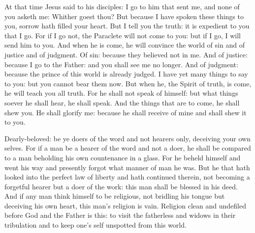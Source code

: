 \begin{multicols}{2}
At that time Jesus said to his disciples:
I go to him that sent me, and none of you asketh me: Whither goest thou?
But because I have spoken these things to you, sorrow hath filled your heart.
But I tell you the truth: it is expedient to you that I go.  For if I go not,
the Paraclete will not come to you: but if I go, I will send him to you.  And
when he is come, he will convince the world of sin and of justice and of
judgment.   Of sin: because they believed not in me.  And
of justice: because I go to the Father: and you shall see me no longer.  And of
judgment: because the prince of this world is already judged.  I have yet many
things to say to you: but you cannot bear them now.  But when he, the Spirit of
truth, is come, he will teach you all truth. For he shall not speak of himself:
but what things soever he shall hear, he shall speak. And the things that are
to come, he shall shew you.   He shall glorify me: because he shall receive
of mine and shall shew it to you.


\bigskip



Dearly-beloved: be ye doers of the word and not hearers only, deceiving your own selves.
For if a man be a hearer of the word and not a doer, he shall be compared to a
man beholding his own countenance in a glass.  For he beheld himself and went
his way and presently forgot what manner of man he was.  But he that hath
looked into the perfect law of liberty and hath continued therein, not becoming
a forgetful hearer but a doer of the work: this man shall be blessed in his
deed.  And if any man think himself to be religious, not bridling his tongue
but deceiving his own heart, this man's religion is vain.  Religion clean and
undefiled before God and the Father is this: to visit the fatherless and widows
in their tribulation and to keep one's self unspotted from this world.



\end{multicols}
